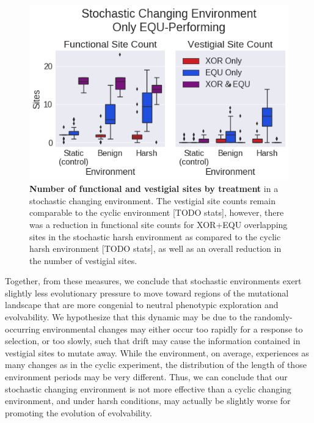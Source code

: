 \documentclass[PhD]{msu-thesis}
\begin{document}
	\begin{figure}[!h]
	\includegraphics[trim={0 0 0 0}, clip, width=0.75\columnwidth]{figures/CE/CSE_func_vest__filtered__box.png}
	\caption{\textbf{Number of functional and vestigial sites by treatment} in a stochastic changing environment. The vestigial site counts remain comparable to the cyclic environment [TODO stats], however, there was a reduction in functional site counts for XOR+EQU overlapping sites in the stochastic harsh environment as compared to the cyclic harsh environment [TODO stats], as well as an overall reduction in the number of vestigial sites.%
	}
	\label{fig:CSE_func_vestigial} %
	\end{figure}

Together, from these measures, we conclude that stochastic environments exert slightly less evolutionary pressure to move toward regions of the mutational landscape that are more congenial to neutral phenotypic exploration and evolvability. We hypothesize that this dynamic may be due to the randomly-occurring environmental changes may either occur too rapidly for a response to selection, or too slowly, such that drift may cause the information contained in vestigial sites to mutate away. While the environment, on average, experiences as many changes as in the cyclic experiment, the distribution of the length of those environment periods may be very different. Thus, we can conclude that our stochastic changing environment is not more effective than a cyclic changing environment, and under harsh conditions, may actually be slightly worse for promoting the evolution of evolvability.
\end{document}
